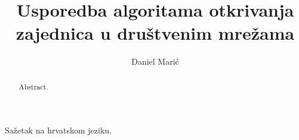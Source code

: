 \documentclass[times, utf8, diplomski]{fer}
\begin{document}

\title{Usporedba algoritama otkrivanja zajednica u društvenim mrežama}

\author{Daniel Marić}

\maketitle

\izvornik

\zahvala{}

\tableofcontents


















\begin{sazetak}
Sažetak na hrvatskom jeziku.

\end{sazetak}

\begin{abstract}
Abstract.

\end{abstract}
\end{document}
